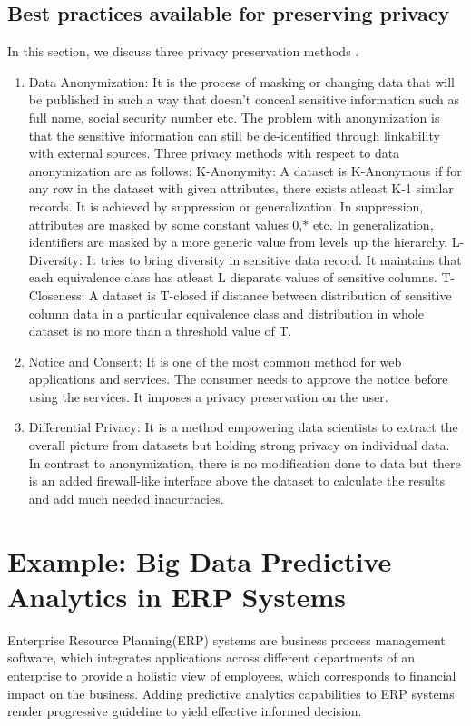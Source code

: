 \documentclass[runningheads]{llncs}
\begin{document}
\subsection{Best practices available for preserving privacy}
In this section, we discuss three privacy preservation methods \cite{16}.
\begin{enumerate}
	\item Data Anonymization: It is the process of masking or changing data that will be published in such a way that doesn't conceal sensitive information such as full name, social security number etc. The problem with anonymization is that the sensitive information can still be de-identified through linkability with external sources. Three privacy methods with respect to data anonymization are as follows:
	\subitem K-Anonymity: A dataset is K-Anonymous if for any row in the dataset with given attributes, there exists atleast K-1 similar records. It is achieved by suppression or generalization.
	In suppression, attributes are masked by some constant values 0,* etc.
	In generalization, identifiers are masked by a more generic value from levels up the hierarchy.
	\subitem L-Diversity: It tries to bring diversity in sensitive data record. It maintains that each equivalence class has atleast L disparate values of sensitive columns.
	\subitem T-Closeness: A dataset is T-closed if distance between distribution of sensitive column data in a particular equivalence class and distribution in whole dataset is no more than a threshold value of T.
	\item Notice and Consent: It is one of the most common method for web applications and services. The consumer needs to approve the notice before using the services. It imposes a privacy preservation on the user.
	\item Differential Privacy: It is a method empowering data scientists to extract the overall picture from datasets but holding strong privacy on individual data. In contrast to anonymization, there is no modification done to data but there is an added firewall-like interface above the dataset to calculate the results and add much needed inacurracies.
\end{enumerate}
\section{Example: Big Data Predictive Analytics in ERP Systems}
Enterprise Resource Planning(ERP) systems are business process management software, which integrates applications across different departments of an enterprise to provide a holistic view of employees, which corresponds to financial impact on the business. Adding predictive analytics capabilities to ERP systems render progressive guideline to yield effective informed decision. 
\end{document}

